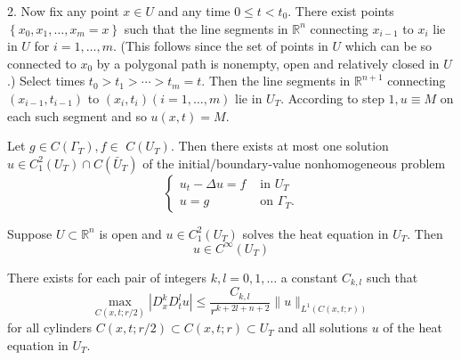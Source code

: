 \begin{theorem}
    2. Now fix any point $x \in U$ and any time $0 \leq t<t_0$. There exist points $\left\{x_0, x_1, \ldots, x_m=x\right\}$ such that the line segments in $\mathbb{R}^n$ connecting $x_{i-1}$ to $x_i$ lie in $U$ for $i=1, \ldots, m$. (This follows since the set of points in $U$ which can be so connected to $x_0$ by a polygonal path is nonempty, open and relatively closed in $U$.) Select times $t_0>t_1>\cdots>t_m=t$. Then the line segments in $\mathbb{R}^{n+1}$ connecting $\left(x_{i-1}, t_{i-1}\right)$ to $\left(x_i, t_i\right)(i=1, \ldots, m)$ lie in $U_T$. According to step $1, u \equiv M$ on each such segment and so $u(x, t)=M$.
\end{theorem}
\begin{theorem}
    Let $g \in C\left(\Gamma_T\right), f \in$ $C\left(U_T\right)$. Then there exists at most one solution $u \in C_1^2\left(U_T\right) \cap C\left(\bar{U}_T\right)$ of the initial/boundary-value nonhomogeneous problem
    \begin{equation*}
        \left\{\begin{aligned}
            u_t-\Delta u=f & \text { in } U_T        \\
            u=g            & \text { on } \Gamma_T .
        \end{aligned}\right.
    \end{equation*}
\end{theorem}
\begin{theorem}[Smoothness]
    Suppose $U\subset \mathbb{R}^n$ is open and $u \in C_1^2\left(U_T\right)$ solves the heat equation in $U_T$. Then
    \begin{equation*}
        u \in C^{\infty}\left(U_T\right)
    \end{equation*}
\end{theorem}
\begin{theorem}
    There exists for each pair of integers $k, l=0,1, \ldots$ a constant $C_{k, l}$ such that
    \begin{equation*}
        \max _{C(x, t ; r / 2)}\left|D_x^k D_t^l u\right| \leq \frac{C_{k , l}}{r^{k+2 l+n+2}}\|u\|_{L^1(C(x, t ; r))}
    \end{equation*}
    for all cylinders $C(x, t ; r / 2) \subset C(x, t ; r) \subset U_T$ and all solutions $u$ of the heat equation in $U_T$.
\end{theorem}

